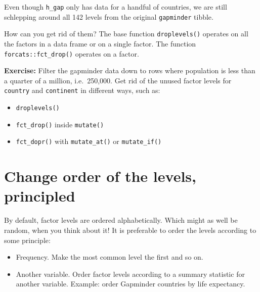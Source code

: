 \documentclass[
]{book}
\newenvironment{Shaded}{\begin{snugshade}}{\end{snugshade}}
\newcommand{\CommentTok}[1]{\textcolor[rgb]{0.56,0.35,0.01}{\textit{#1}}}
\newcommand{\KeywordTok}[1]{\textcolor[rgb]{0.13,0.29,0.53}{\textbf{#1}}}
\newcommand{\NormalTok}[1]{#1}
\newcommand{\OperatorTok}[1]{\textcolor[rgb]{0.81,0.36,0.00}{\textbf{#1}}}
\newcommand{\StringTok}[1]{\textcolor[rgb]{0.31,0.60,0.02}{#1}}
\providecommand{\tightlist}{%
  \setlength{\itemsep}{0pt}\setlength{\parskip}{0pt}}
\begin{document}
Even though \texttt{h\_gap} only has data for a handful of countries, we are still schlepping around all 142 levels from the original \texttt{gapminder} tibble.

How can you get rid of them? The base function \texttt{droplevels()} operates on all the factors in a data frame or on a single factor. The function \texttt{forcats::fct\_drop()} operates on a factor.

\begin{Shaded}
\end{Shaded}

\textbf{Exercise:} Filter the gapminder data down to rows where population is less than a quarter of a million, i.e.~250,000. Get rid of the unused factor levels for \texttt{country} and \texttt{continent} in different ways, such as:

\begin{itemize}
\tightlist
\item
  \texttt{droplevels()}
\item
  \texttt{fct\_drop()} inside \texttt{mutate()}
\item
  \texttt{fct\_dopr()} with \texttt{mutate\_at()} or \texttt{mutate\_if()}
\end{itemize}

\hypertarget{reorder-factors}{%
\section{Change order of the levels, principled}\label{reorder-factors}}

By default, factor levels are ordered alphabetically. Which might as well be random, when you think about it! It is preferable to order the levels according to some principle:

\begin{itemize}
\tightlist
\item
  Frequency. Make the most common level the first and so on.
\item
  Another variable. Order factor levels according to a summary statistic for another variable. Example: order Gapminder countries by life expectancy.
\end{itemize}
\end{document}
